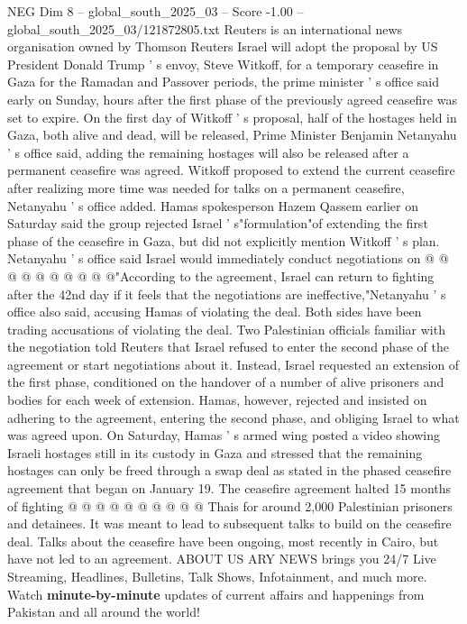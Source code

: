 \begin{textsample}{NEG Dim 8 – global\_south\_2025\_03 – Score -1.00 – global\_south\_2025\_03/121872805.txt}  \label{ex:f8_neg_305}
Reuters is an international news organisation owned by Thomson Reuters Israel will adopt the proposal by US President Donald Trump ' s envoy, Steve Witkoff, for a temporary ceasefire in Gaza for the Ramadan and Passover periods, the prime minister ' s office said early on Sunday, hours after the first phase of the previously agreed ceasefire was set to expire.
On the first day of Witkoff ' s proposal, half of the hostages held in Gaza, both alive and dead, will be released, Prime Minister Benjamin Netanyahu ' s office said, adding the remaining hostages will also be released after a permanent ceasefire was agreed.
Witkoff proposed to extend the current ceasefire after realizing more time was needed for talks on a permanent ceasefire, Netanyahu ' s office added.
Hamas spokesperson Hazem Qassem earlier on Saturday said the group rejected Israel ' s"formulation"of extending the first phase of the ceasefire in Gaza, but did not explicitly mention Witkoff ' s plan.
Netanyahu ' s office said Israel would immediately conduct negotiations on @ @ @ @ @ @ @ @ @ @"According to the agreement, Israel can return to fighting after the 42nd day if it feels that the negotiations are ineffective,"Netanyahu ' s office also said, accusing Hamas of violating the deal.
Both sides have been trading accusations of violating the deal.
Two Palestinian officials familiar with the negotiation told Reuters that Israel refused to enter the second phase of the agreement or start negotiations about it.
Instead, Israel requested an extension of the first phase, conditioned on the handover of a number of alive prisoners and bodies for each week of extension.
Hamas, however, rejected and insisted on adhering to the agreement, entering the second phase, and obliging Israel to what was agreed upon.
On Saturday, Hamas ' s armed wing posted a video showing Israeli hostages still in its custody in Gaza and stressed that the remaining hostages can only be freed through a swap deal as stated in the phased ceasefire agreement that began on January 19.
The ceasefire agreement halted 15 months of fighting @ @ @ @ @ @ @ @ @ @ Thais for around 2,000 Palestinian prisoners and detainees.
It was meant to lead to subsequent talks to build on the ceasefire deal.
Talks about the ceasefire have been ongoing, most recently in Cairo, but have not led to an agreement.
ABOUT US ARY NEWS brings you 24/7 Live Streaming, Headlines, Bulletins, Talk Shows, Infotainment, and much more.
Watch \textbf{minute-by-minute} updates of current affairs and happenings from Pakistan and all around the world!

\end{textsample}
